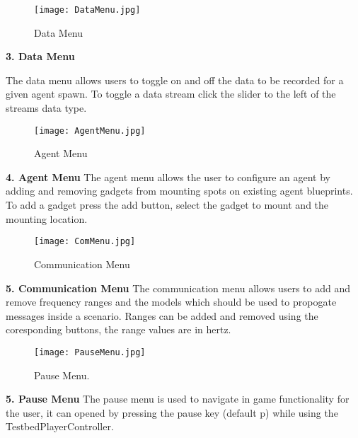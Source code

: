 \documentclass[../main.tex]{subfiles}
\begin{document}
\break

\begin{figure}
\texttt{[image: DataMenu.jpg]}
\caption{Data Menu}
\end{figure}

\textbf{3. Data Menu}

The data menu allows users to toggle on and off the data to be recorded for a given agent spawn. To toggle a data stream click the slider to the left of the streams data type.

\break

\begin{figure}
\texttt{[image: AgentMenu.jpg]}
\caption{Agent Menu}
\end{figure}

\textbf{4. Agent Menu}
The agent menu allows the user to configure an agent by adding and removing gadgets from mounting spots on existing agent blueprints. To add a gadget press the add button, select the gadget to mount and the mounting location.

\break

\begin{figure}
\texttt{[image: ComMenu.jpg]}
\caption{Communication Menu}
\end{figure}

\textbf{5. Communication Menu}
The communication menu allows users to add and remove frequency ranges and the models which should be used to propogate messages inside a scenario. Ranges can be added and removed using the coresponding buttons, the range values are in hertz.

\break

\begin{figure}
\texttt{[image: PauseMenu.jpg]}
\caption{Pause Menu.}
\end{figure}

\textbf{5. Pause Menu}
The pause menu is used to navigate in game functionality for the user, it can opened by pressing the pause key (default p) while using the TestbedPlayerController.
\end{document}
